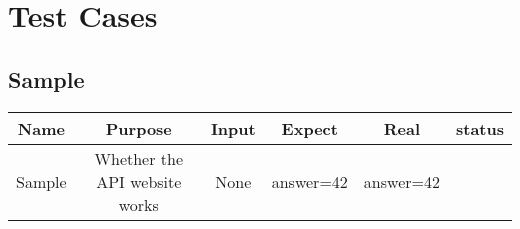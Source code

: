 \section{Test Cases}
\label{app:testcase}
\subsection{Sample}
\begin{center}
  \begin{tabular}{c|c|c|c|c|c}
    \hline
    Name   & Purpose                       & Input & Expect    & Real      & status \\ \hline
    Sample & Whether the API website works & None  & answer=42 & answer=42 &        \\ \hline
  \end{tabular}
\end{center}
